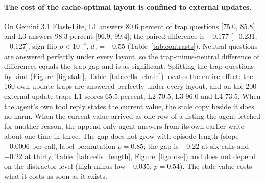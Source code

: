 \begin{table}[t]
\centering\scriptsize

\caption{Per-layout means. Trap accuracy is the per-episode mean with a task-bootstrap 95 percent interval; neutral accuracy is the per-episode mean; success is the share of episodes with every question right; cost is the provider-billed amount per episode; cached share is cached prompt tokens over prompt tokens, summed over the episode. Gemini 2.5 Flash ran 72 tasks under L1, L3 and L4; Gemini 3.6 Flash ran 36 tasks under L1 and L3.}
\label{tab:main}
\end{table}

\begin{table}[t]
\centering\scriptsize
\resizebox{\textwidth}{!}{}
\caption{Paired within-task contrasts on Gemini 3.1 Flash-Lite (144 tasks): mean difference, task-bootstrap 95 percent interval, two-sided sign-flip $p$. Bold survives BH. Cost differences are in cents.}
\label{tab:contrasts}
\end{table}

\paragraph{The cost of the cache-optimal layout is confined to external updates.} On Gemini 3.1 Flash-Lite, L1 answers 80.6 percent of trap questions [75.0, 85.8] and L3 answers 98.3 percent [96.9, 99.4]; the paired difference is $-0.177$ [$-0.231$, $-0.127$], sign-flip $p < 10^{-4}$, $d_z = -0.55$ (Table~\ref{tab:contrasts}). Neutral questions are answered perfectly under every layout, so the trap-minus-neutral difference of differences equals the trap gap and is as significant. Splitting the trap questions by kind (Figure~\ref{fig:stale}, Table~\ref{tab:cells_chain}) locates the entire effect: the 160 own-update traps are answered perfectly under every layout, and on the 200 external-update traps L1 scores 65.5 percent, L2 70.5, L3 96.0 and L4 73.5. When the agent's own tool reply states the current value, the stale copy beside it does no harm. When the current value arrived as one row of a listing the agent fetched for another reason, the append-only agent answers from its own earlier write about one time in three. The gap does not grow with episode length (slope $+0.0006$ per call, label-permutation $p = 0.85$; the gap is $-0.22$ at six calls and $-0.22$ at thirty, Table~\ref{tab:cells_length}, Figure~\ref{fig:dose}) and does not depend on the distractor level (high minus low $-0.035$, $p = 0.54$). The stale value costs what it costs as soon as it exists.

